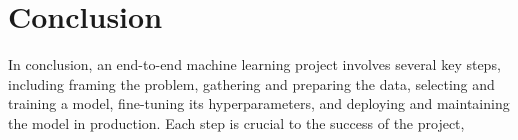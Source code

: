 \documentclass{article}
\begin{document}
\section{Conclusion}
In conclusion, an end-to-end machine learning project involves several key steps, including framing the problem, gathering and preparing the data, selecting and training a model, fine-tuning its hyperparameters, and deploying and maintaining the model in production. Each step is crucial to the success of the project,
\end{document}
